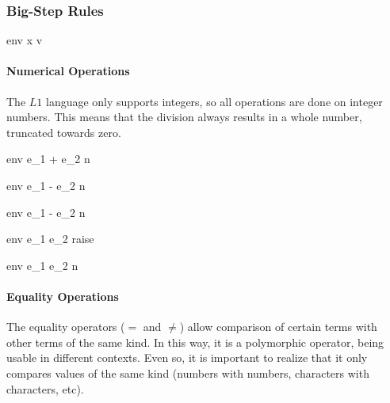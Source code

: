 \documentclass{article}
\begin{document}
\subsubsection{Big-Step Rules}

	
	

	{\mbox{env} \vdash x \Downarrow v}
	
\paragraph{Numerical Operations}
The $L1$ language only supports integers, so all operations are done on integer numbers.
This means that the division always results in a whole number, truncated towards zero.

\medskip

	{\mbox{env} \vdash e_1 + e_2 \Downarrow n}
	
	{\mbox{env} \vdash e_1 - e_2 \Downarrow n}
	
	{\mbox{env} \vdash e_1 - e_2 \Downarrow n}
	
	{\mbox{env} \vdash e_1 \div e_2 \Downarrow raise}
	
	{\mbox{env} \vdash e_1 \div e_2 \Downarrow n}
	
\paragraph{Equality Operations}
The equality operators ($=$ and $\neq$) allow comparison of certain terms with other terms of the same kind.
In this way, it is a polymorphic operator, being usable in different contexts.
Even so, it is important to realize that it only compares values of the same kind (numbers with numbers, characters with characters, etc).
\end{document}
